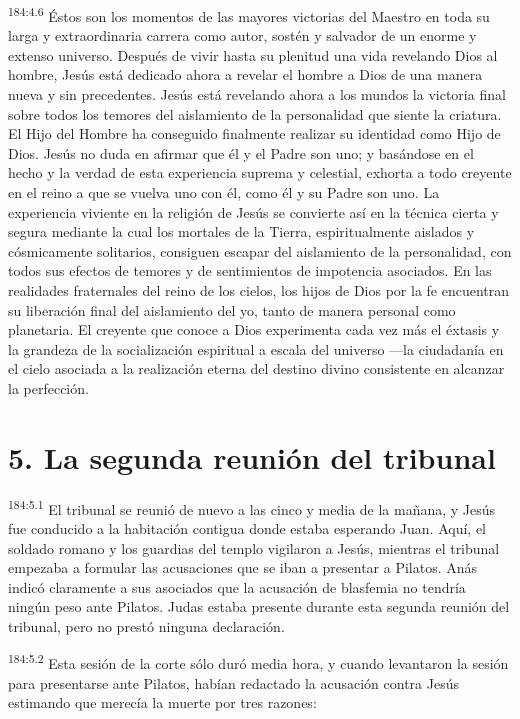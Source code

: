 \par 
\textsuperscript{184:4.6} Éstos son los momentos de las mayores victorias del Maestro en toda su larga y extraordinaria carrera como autor, sostén y salvador de un enorme y extenso universo. Después de vivir hasta su plenitud una vida revelando Dios al hombre, Jesús está dedicado ahora a revelar el hombre a Dios de una manera nueva y sin precedentes. Jesús está revelando ahora a los mundos la victoria final sobre todos los temores del aislamiento de la personalidad que siente la criatura. El Hijo del Hombre ha conseguido finalmente realizar su identidad como Hijo de Dios. Jesús no duda en afirmar que él y el Padre son uno; y basándose en el hecho y la verdad de esta experiencia suprema y celestial, exhorta a todo creyente en el reino a que se vuelva uno con él, como él y su Padre son uno. La experiencia viviente en la religión de Jesús se convierte así en la técnica cierta y segura mediante la cual los mortales de la Tierra, espiritualmente aislados y cósmicamente solitarios, consiguen escapar del aislamiento de la personalidad, con todos sus efectos de temores y de sentimientos de impotencia asociados. En las realidades fraternales del reino de los cielos, los hijos de Dios por la fe encuentran su liberación final del aislamiento del yo, tanto de manera personal como planetaria. El creyente que conoce a Dios experimenta cada vez más el éxtasis y la grandeza de la socialización espiritual a escala del universo ---la ciudadanía en el cielo asociada a la realización eterna del destino divino consistente en alcanzar la perfección.

\section*{5. La segunda reunión del tribunal}
\par 
\textsuperscript{184:5.1} El tribunal se reunió de nuevo a las cinco y media de la mañana, y Jesús fue conducido a la habitación contigua donde estaba esperando Juan. Aquí, el soldado romano y los guardias del templo vigilaron a Jesús, mientras el tribunal empezaba a formular las acusaciones que se iban a presentar a Pilatos. Anás indicó claramente a sus asociados que la acusación de blasfemia no tendría ningún peso ante Pilatos. Judas estaba presente durante esta segunda reunión del tribunal, pero no prestó ninguna declaración.

\par 
\textsuperscript{184:5.2} Esta sesión de la corte sólo duró media hora, y cuando levantaron la sesión para presentarse ante Pilatos, habían redactado la acusación contra Jesús estimando que merecía la muerte por tres razones:

